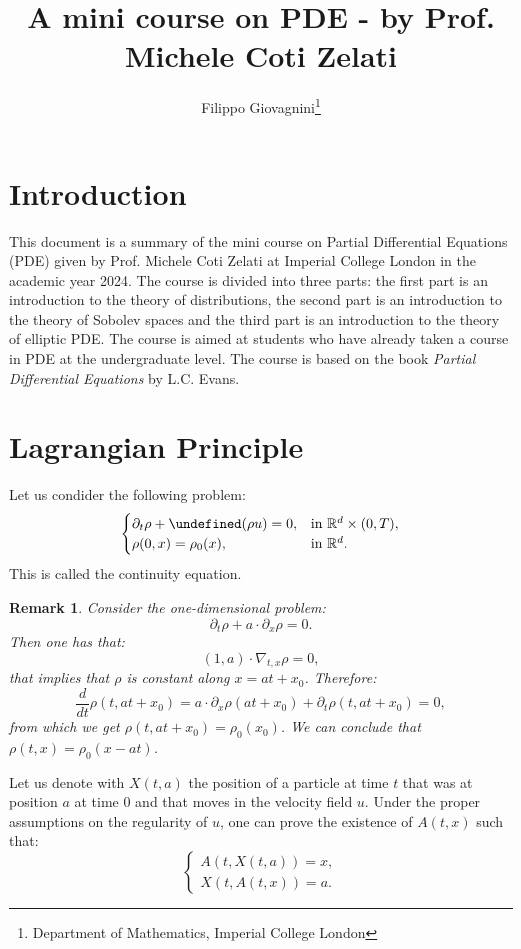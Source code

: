 \documentclass{article}
\title{A mini course on PDE - by Prof. Michele Coti Zelati}
\author{Filippo Giovagnini\footnote{Department of Mathematics, Imperial College London}}
\newcommand{\R}{\mathbb{R}}
\let\div\undefined\DeclareMathOperator{\div}{div}
\theoremstyle{mystyle}
\theoremstyle{mystyleNormalFont}
\newtheorem{remark}[theorem]{Remark}
\theoremstyle{plain}
\let\div\undefined\DeclareMathOperator{\div}{div}
\begin{document}
\maketitle

\section{Introduction}

This document is a summary of the mini course on Partial Differential Equations (PDE) given by Prof. Michele Coti Zelati at Imperial College London in the academic year 2024. The course is divided into three parts: the first part is an introduction to the theory of distributions, the second part is an introduction to the theory of Sobolev spaces and the third part is an introduction to the theory of elliptic PDE. The course is aimed at students who have already taken a course in PDE at the undergraduate level. The course is based on the book \textit{Partial Differential Equations} by L.C. Evans.

\section{Lagrangian Principle}

Let us condider the following problem:
\begin{equation}
    \label{eq:continuity}
    \begin{cases}
        \partial_t \rho + \div(\rho u) = 0, & \text{in } \R^d \times (0, T), \\
        \rho(0, x) = \rho_0(x), & \text{in } \R^d.
    \end{cases}
\end{equation}
This is called the continuity equation.

\begin{remark}
    Consider the one-dimensional problem:
    \begin{equation}
        \partial_t \rho + a \cdot \partial_x \rho = 0.
    \end{equation}
Then one has that:
\[
(1, a) \cdot \nabla_{t, x} \rho = 0,
\]
that implies that $\rho$ is constant along $x = a t + x_0$. Therefore:
\[
\frac{d}{dt} \rho(t, at + x_0) = a \cdot \partial_x \rho(at + x_0) + \partial_t \rho(t, at + x_0) = 0,\]
from which we get $\rho(t, at + x_0) = \rho_0(x_0)$. We can conclude that $\rho(t, x) = \rho_0(x - at)$.
\end{remark}

Let us denote with $X(t,a)$ the position of a particle at time $t$ that was at position $a$ at time $0$ and that moves in the velocity field $u$. Under the proper assumptions on the regularity of $u$, one can prove the existence of $A(t, x)$ such that:
\[
\begin{cases}
A(t, X(t, a)) = x, \\
X(t, A(t, x)) = a.
\end{cases}\]
\end{document}
